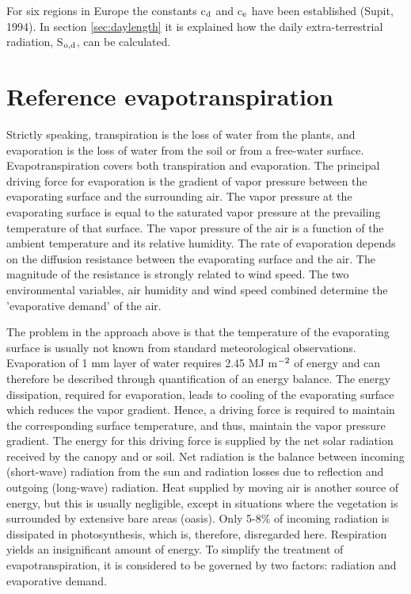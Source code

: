 For six regions in Europe the constants c$_{{\rm d}}$ and c$_{{\rm e}}$ have been 
established (Supit, 1994). In section \ref{sec:daylength} it is explained how the 
daily extra-terrestrial radiation, S$_{{\rm o,d}}$, can be calculat\-ed.

\section{Reference evapotranspiration}

Strictly speaking, transpiration is the loss of water from the plants, and evaporation is the
loss of water from the soil or from a free-water surface. Evapotranspiration covers both
transpiration and evaporation.
The principal driving force for evaporation is the gradient of vapor pressure between the
evaporating surface and the surrounding air. The vapor pressure at the evaporating
surface is equal to the saturated vapor pressure at the prevailing temperature of that
surface. The vapor pressure of the air is a function of the ambient temperature and its
relative humidity. The rate of evaporation depends on the diffusion resistance between the
evaporating surface and the air.
The magnitude of the resistance is strongly related to wind speed. The two environ\-mental
variables, air humidity and wind speed combined determine the 'evaporative demand' of
the air.

The problem in the approach above is that the temperature of the evaporating surface is
usually not known from standard meteorological observations. Evaporation  of 1 mm
layer of water requires 2.45 MJ m$^{{\rm -2}}$ of energy and can therefore be described through
quantification of an energy balance. The energy dissipation, required for evaporation,
leads to cooling of the evaporating surface which reduces the vapor gradient. Hence, a
driving force is required to maintain the corresponding surface temperature, and thus,
maintain the vapor pres\-sure gradient. The energy for this driving force is supplied by the
net solar radiation received by the canopy and or soil.
Net radiation is the balance between incoming (short-wave) radiation from the sun and
radiation losses due to reflection and outgoing (long-wave) radiation. Heat supplied by
moving air is another source of energy, but this is usually negligible, except in situations
where the vegetation is surrounded by extensive bare areas (oasis). Only 5-8\% of
incoming radiation is dissipated in photosynthesis, which is, therefore, disregarded here.
Respiration yields an insignificant amount of energy. To simplify the treatment of
evapotranspiration, it is considered to be governed by two factors: radiation and evaporative demand.

